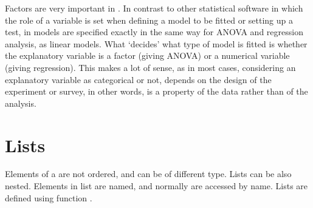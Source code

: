 \documentclass[paper=a4,headsepline,BCOR=12mm,twoside,open=right,%
titlepage,headings=small,fontsize=10pt,index=totoc,bibliography=totoc,%
captions=tableheading,captions=nooneline]{scrbook}\usepackage{knitr}
\begin{document}
Factors are very important in \R. In contrast to other statistical software in which the role of a variable is set when defining a model to be fitted or setting up a test, in \R models are specified exactly in the same way for ANOVA and regression analysis, as linear models. What `decides' what type of model is fitted is whether the explanatory variable is a factor (giving ANOVA) or a numerical variable (giving regression). This makes a lot of sense, as in most cases, considering an explanatory variable as categorical or not, depends on the design of the experiment or survey, in other words, is a property of the data rather than of the analysis.

\section{Lists}

Elements of a  are not ordered, and can be of different type. Lists can be also nested. Elements in list are named, and normally are accessed by name. Lists are defined using function .
\end{document}
